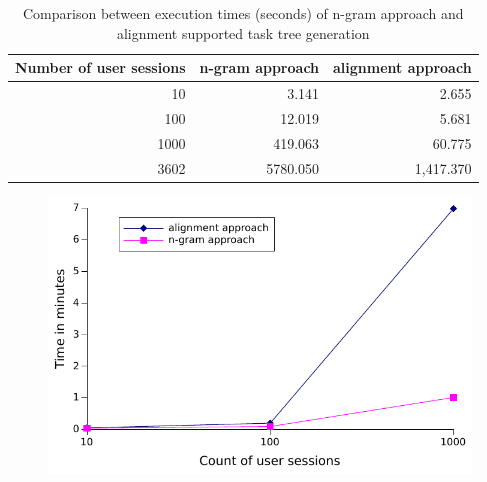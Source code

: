 \begin{table}[h]
	\centering
	\begin{tabular}{ r r r }
		\toprule
		\textbf{Number of user sessions} & \textbf{n-gram approach} & \textbf{alignment approach} \\
		\midrule
		10 	& 3.141 		& 2.655 \\
		100 	& 12.019 	& 5.681 \\
		1000 	& 419.063 	& 60.775 \\
		\midrule
		3602 	& 5780.050 	& 1,417.370 \\
		\bottomrule
	\end{tabular}
	\caption{Comparison between execution times (seconds) of n-gram approach and alignment supported task tree generation}
	\label{tab:comparisontasktreegenerations}
\end{table}

%

 \begin{figure}[h]
	\includegraphics{chapters/casestudy/performance.pdf}
\end{figure}
